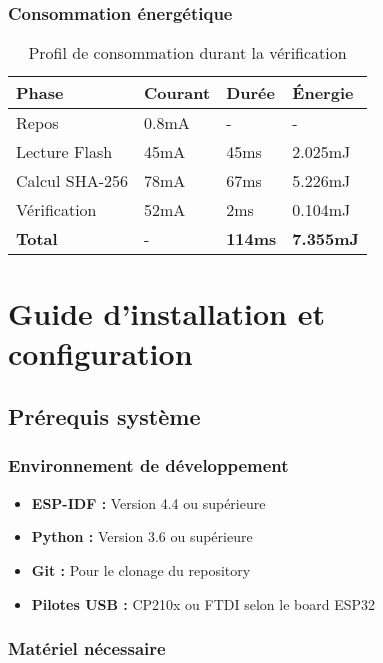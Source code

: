 \subsection{Consommation énergétique}

\begin{table}[h!]
\centering
\caption{Profil de consommation durant la vérification}
\begin{tabular}{@{}llll@{}}
\toprule
\textbf{Phase} & \textbf{Courant} & \textbf{Durée} & \textbf{Énergie} \\
\midrule
Repos & 0.8mA & - & - \\
Lecture Flash & 45mA & 45ms & 2.025mJ \\
Calcul SHA-256 & 78mA & 67ms & 5.226mJ \\
Vérification & 52mA & 2ms & 0.104mJ \\
\textbf{Total} & - & \textbf{114ms} & \textbf{7.355mJ} \\
\bottomrule
\end{tabular}
\end{table}

\chapter{Guide d'installation et configuration}
\label{app:installation}

\section{Prérequis système}

\subsection{Environnement de développement}

\begin{itemize}
    \item \textbf{ESP-IDF :} Version 4.4 ou supérieure
    \item \textbf{Python :} Version 3.6 ou supérieure
    \item \textbf{Git :} Pour le clonage du repository
    \item \textbf{Pilotes USB :} CP210x ou FTDI selon le board ESP32
\end{itemize}

\subsection{Matériel nécessaire}


